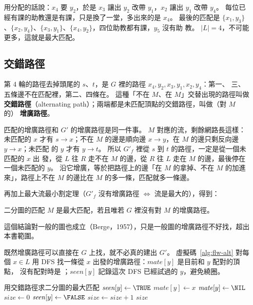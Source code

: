 用分配的話說：$x_4$ 要 $y_2$，於是 $x_3$ 讓出 $y_2$ 改帶 $y_1$，$x_2$ 讓出 $y_1$ 改帶
$y_4$。 每位已經有課的助教還是有課，只是換了一堂，多出來的是 $x_4$。 最後的匹配是
$\{x_1, y_3\}$、$\{x_2, y_4\}$、$\{x_3, y_1\}$、$\{x_4, y_2\}$，四位助教都有課，$y_5$ 沒有助
教。 $|L| = 4$，不可能更多，這就是最大匹配。

\subsection{交錯路徑}
\label{sec:flw-alt}

第 4 輪的路徑去掉頭尾的 $s$、$t$，是 $G$ 裡的路徑 $x_4, y_2, x_3, y_1, x_2, y_4$：第一、
三、五條邊不在匹配裡，第二、四條在。 這種「不在 $M$、在 $M$」交替出現的路徑叫做
\textbf{交錯路徑}（alternating path）；兩端都是未匹配頂點的交錯路徑，叫做（對 $M$ 的）
\textbf{增廣路徑}。

匹配的增廣路徑和 $G'$ 的增廣路徑是同一件事。 $M$ 對應的流，剩餘網路長這樣：未匹配的 $x$
才有 $s \to x$；不在 $M$ 的邊是順向邊 $x \to y$，在 $M$ 的邊只剩反向邊 $y \to x$；未匹配
的 $y$ 才有 $y \to t$。 所以 $G'_f$ 裡從 $s$ 到 $t$ 的路徑，一定是從一個未匹配的 $x$ 出
發，從 $L$ 往 $R$ 走不在 $M$ 的邊，從 $R$ 往 $L$ 走在 $M$ 的邊，最後停在一個未匹配的 $y$。
沿它增廣，等於把路徑上的邊「在 $M$ 的拿掉、不在 $M$ 的加進來」，路徑上不在 $M$ 的邊比在
$M$ 的多一條，匹配就多一條邊。

再加上最大流最小割定理（$G'_f$ 沒有增廣路徑 $\Leftrightarrow$ 流是最大的），得到：

\begin{corollary}
\label{cor:flw-berge}
二分圖的匹配 $M$ 是最大匹配，若且唯若 $G$ 裡沒有對 $M$ 的增廣路徑。
\end{corollary}

這個結論對一般的圖也成立（Berge，1957），只是一般圖的增廣路徑不好找，超出本書範圍。

既然增廣路徑可以直接在 $G$ 上找，就不必真的建出 $G'$。 虛擬碼~\ref{alg:flw-alt} 對每個
$x \in L$ 用 DFS 找一條從 $x$ 出發的增廣路徑：$\mathit{mate}[y]$ 是目前和 $y$ 配對的頂點，
沒有配對時是 \NIL；$\mathit{seen}[y]$ 記錄這次 DFS 已經試過的 $y$，避免繞圈。

\begin{pseudo}[label=alg:flw-alt]{用交錯路徑求二分圖的最大匹配}
 
            \State $\mathit{seen}[y] \gets \TRUE$
                \State $\mathit{mate}[y] \gets x$
                \State \Return \TRUE
            \EndIf
        \EndIf
    \EndFor
    \State \Return \FALSE
\EndProcedure
\Statex
{}
        \State $\mathit{mate}[y] \gets \NIL$
    \EndFor
    \State $\mathit{size} \gets 0$
            \State $\mathit{seen}[y] \gets \FALSE$
        \EndFor
            \State $\mathit{size} \gets \mathit{size} + 1$
        \EndIf
    \EndFor
    \State \Return $\mathit{size}$
\EndProcedure
\end{pseudo}

